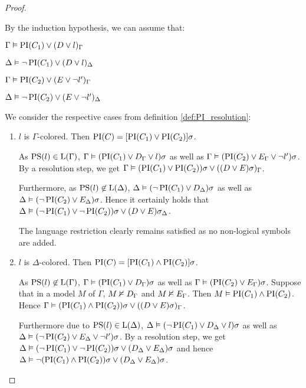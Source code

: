 \begin{proof}
\begin{indproof}
			By the induction hypothesis, we can assume that:

			$\Gamma \vDash \operatorname{PI}(C_1) \lor (D\lor l)_\Gamma$

			$\Delta \vDash \lnot \operatorname{PI}(C_1) \lor (D\lor l)_\Delta$

			$\Gamma \vDash \operatorname{PI}(C_2) \lor (E\lor \lnot l')_\Gamma$

			$\Delta \vDash \lnot \operatorname{PI}(C_2) \lor (E\lor \lnot l')_\Delta$

			We consider the respective cases from definition \ref{def:PI_resolution}:

			\begin{enumerate}
				\item $l$ is $\Gamma$-colored.
					\label{huang_proof_prop_case_1}
					Then $\operatorname{PI}(C) = [\operatorname{PI}(C_1) \lor \operatorname{PI}(C_2)]\sigma$. 

					As $\operatorname{PS}(l) \in \operatorname{L}(\Gamma)$,
					$\Gamma \vDash (\operatorname{PI}(C_1) \lor D_\Gamma\lor l)\sigma$
					as well as $\Gamma \vDash (\operatorname{PI}(C_2) \lor E_\Gamma\lor \lnot l')\sigma$.
					By a resolution step, we get $\Gamma \vDash (\operatorname{PI}(C_1) \lor \operatorname{PI}(C_2))\sigma \lor ((D \lor E)\sigma)_\Gamma$.

					Furthermore, as $\operatorname{PS}(l) \not\in \operatorname{L}(\Delta)$, 
					$\Delta \vDash (\lnot\operatorname{PI}(C_1) \lor D_\Delta)\sigma$
					as well as $\Delta \vDash (\lnot\operatorname{PI}(C_2) \lor E_\Delta)\sigma$.
					Hence it certainly holds that $\Delta \vDash (\lnot \operatorname{PI}(C_1) \lor \lnot\operatorname{PI}(C_2))\sigma \lor (D \lor E)\sigma_\Delta$.

					The language restriction clearly remains satisfied as no non-logical symbols are added.

				\item $l$ is $\Delta$-colored.
					\label{huang_proof_prop_case_2}
					Then $\operatorname{PI}(C) = [\operatorname{PI}(C_1) \land \operatorname{PI}(C_2)]\sigma$. 

					As $\operatorname{PS}(l) \not\in \operatorname{L}(\Gamma)$,
					$\Gamma \vDash (\operatorname{PI}(C_1) \lor D_\Gamma)\sigma$
					as well as $\Gamma \vDash (\operatorname{PI}(C_2) \lor E_\Gamma)\sigma$.
					Suppose that in a model $M$ of $\Gamma$, $M \nvDash D_\Gamma$ and $M \nvDash E_\Gamma$. Then $M \vDash \operatorname{PI}(C_1) \land \operatorname{PI}(C_2)$.
					Hence 
					$\Gamma \vDash (\operatorname{PI}(C_1) \land \operatorname{PI}(C_2))\sigma \lor ((D \lor E)\sigma)_\Gamma$.

					Furthermore due to $\operatorname{PS}(l) \in \operatorname{L}(\Delta)$,
					$\Delta \vDash (\lnot\operatorname{PI}(C_1) \lor D_\Delta \lor l)\sigma$
					as well as $\Delta \vDash (\lnot\operatorname{PI}(C_2) \lor E_\Delta \lor \lnot l')\sigma$.
					By a resolution step, we get $\Delta \vDash (\lnot\operatorname{PI}(C_1) \lor \lnot\operatorname{PI}(C_2))\sigma \lor (D_\Delta \lor E_\Delta)\sigma $
					and hence 
					$\Delta \vDash \lnot (\operatorname{PI}(C_1) \land \operatorname{PI}(C_2))\sigma \lor (D_\Delta \lor E_\Delta)\sigma $.


\end{enumerate}
\end{indproof}
\end{proof}
